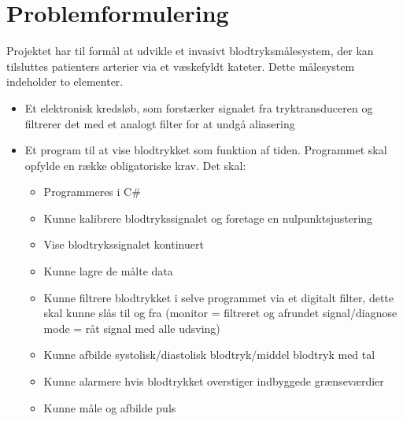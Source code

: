 \section{Problemformulering}
Projektet har til formål at udvikle et invasivt blodtryksmålesystem, der kan tilsluttes patienters arterier via et væskefyldt kateter. Dette målesystem indeholder to elementer.

\begin{itemize}
	\item Et elektronisk kredsløb, som forstærker signalet fra tryktransduceren og filtrerer det med et analogt filter for at undgå aliasering	
	\item Et program til at vise blodtrykket som funktion af tiden. Programmet skal opfylde en række obligatoriske krav. Det skal:
	\begin{itemize}
		\item Programmeres i C\#
		\item Kunne kalibrere blodtrykssignalet og foretage en nulpunktsjustering
		\item Vise blodtrykssignalet kontinuert
		\item Kunne lagre de målte data
		\item Kunne filtrere blodtrykket i selve programmet via et digitalt filter, dette skal kunne slås til og fra (monitor = filtreret og afrundet signal/diagnose mode = råt signal med alle udsving)
		\item Kunne afbilde systolisk/diastolisk blodtryk/middel blodtryk med tal
		\item Kunne alarmere hvis blodtrykket overstiger indbyggede grænseværdier
		\item Kunne måle og afbilde puls
	\end{itemize}	
\end{itemize}

